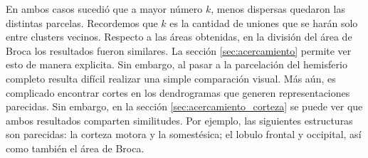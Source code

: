 En ambos casos sucedi\'o que a mayor n\'umero $k$, menos dispersas quedaron las
distintas parcelas. Recordemos que $k$ es la cantidad de uniones que se har\'an
solo entre clusters vecinos. Respecto a las \'areas obtenidas, en la divisi\'on
del \'area de Broca los resultados fueron similares. La secci\'on \ref{sec:acercamiento} 
permite ver esto de manera explicita. Sin embargo, al pasar a la parcelaci\'on 
del hemisferio completo resulta dif\'icil realizar una simple comparaci\'on visual.
M\'as a\'un, es complicado encontrar cortes en los dendrogramas que generen 
representaciones parecidas. Sin embargo, en la secci\'on \ref{sec:acercamiento_corteza}
se puede ver que ambos resultados comparten similitudes. Por ejemplo, las 
siguientes estructuras son parecidas: la corteza motora y la somest\'esica; 
el lobulo frontal y occipital, as\'i como tambi\'en el \'area de Broca.



